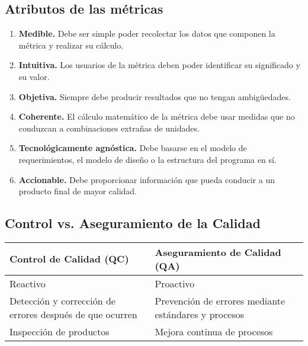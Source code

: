 \subsection{Atributos de las métricas}\label{subsec:atributos-de-las-metricas}
\begin{enumerate}
    \item \textbf{Medible. }Debe ser simple poder recolectar los datos que componen la métrica y realizar su cálculo.
    \item \textbf{Intuitiva.} Los usuarios de la métrica deben poder identificar su significado y su valor.
    \item \textbf{Objetiva.} Siempre debe producir resultados que no tengan ambigüedades.
    \item \textbf{Coherente.} El cálculo matemático de la métrica debe usar medidas que no conduzcan a combinaciones extrañas de unidades.
    \item \textbf{Tecnológicamente agnóstica.} Debe basarse en el modelo de requerimientos, el modelo de diseño o la estructura del programa en sí.
    \item \textbf{Accionable.} Debe proporcionar información que pueda conducir a un producto final de mayor calidad.
\end{enumerate}

\subsection{Control vs. Aseguramiento de la Calidad}\label{subsec:control-vs.-aseguramiento-de-la-calidad}

\begin{center}
    \begin{tabularx}{\textwidth}{|X|X|}
        \hline
        \textbf{Control de Calidad (QC)}                         & \textbf{Aseguramiento de Calidad (QA)}               \\
        \hline
        Reactivo                                                 & Proactivo                                            \\
        Detección y corrección de errores después de que ocurren & Prevención de errores mediante estándares y procesos \\
        Inspección de productos                                  & Mejora continua de procesos                          \\
        \hline
    \end{tabularx}
\end{center}

